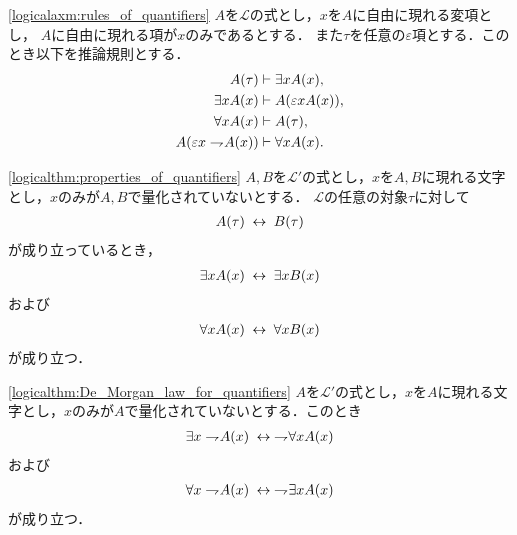 	\begin{screen}
		\begin{logicalaxm}[量化記号に関する規則]
		\ref{logicalaxm:rules_of_quantifiers}
			$A$を$\mathcal{L}$の式とし，$x$を$A$に自由に現れる変項とし，
			$A$に自由に現れる項が$x$のみであるとする．
			また$\tau$を任意の$\varepsilon$項とする．このとき以下を推論規則とする．
			\begin{align}
				A(\tau) &\vdash \exists x A(x), \\
				\exists x A(x) &\vdash A(\varepsilon x A(x)), \\
				\forall x A(x) &\vdash A(\tau), \\
				A(\varepsilon x \rightharpoondown\hspace{-0.25em} A(x)) &\vdash \forall x A(x).
			\end{align}
		\end{logicalaxm}
	\end{screen}
	
	\begin{screen}
		\begin{logicalthm}[量化記号の性質(イ)]
		\ref{logicalthm:properties_of_quantifiers}
			$A,B$を$\mathcal{L}'$の式とし，$x$を$A,B$に現れる文字とし，$x$のみが$A,B$で量化されていないとする．
			$\mathcal{L}$の任意の対象$\tau$に対して
			\begin{align}
				A(\tau) \hspace{0.25em}\leftrightarrow\hspace{0.25em} B(\tau)
			\end{align}
			が成り立っているとき，
			\begin{align}
				\exists x A(x) \hspace{0.25em}\leftrightarrow\hspace{0.25em} \exists x B(x)
			\end{align}
			および
			\begin{align}
				\forall x A(x) \hspace{0.25em}\leftrightarrow\hspace{0.25em} \forall x B(x)
			\end{align}
			が成り立つ．
		\end{logicalthm}
	\end{screen}
	
	\begin{screen}
		\begin{logicalthm}
		\ref{logicalthm:De_Morgan_law_for_quantifiers}
			$A$を$\mathcal{L}'$の式とし，$x$を$A$に現れる文字とし，$x$のみが$A$で量化されていないとする．このとき
			\begin{align}
				\exists x \rightharpoondown\hspace{-0.25em} A(x) \hspace{0.25em}\leftrightarrow\hspace{0.25em} \rightharpoondown\hspace{-0.25em} \forall x A(x)
			\end{align}
			および
			\begin{align}
				\forall x \rightharpoondown\hspace{-0.25em} A(x) \hspace{0.25em}\leftrightarrow\hspace{0.25em} \rightharpoondown\hspace{-0.25em} \exists x A(x)
			\end{align}
			が成り立つ．
		\end{logicalthm}
	\end{screen}
	
